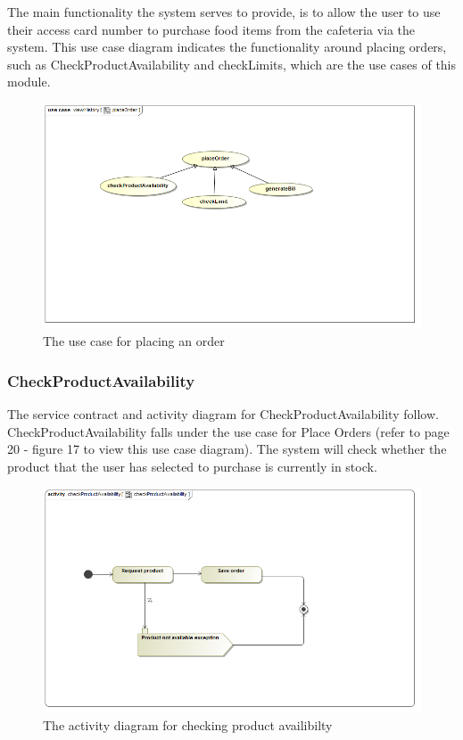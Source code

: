 \documentclass[a4paper,12pt]{article}
\begin{document}
The main functionality the system serves to provide, is  to allow the user to use their access card number to purchase food items from the cafeteria via the system. This use case diagram indicates the functionality around placing orders, such as CheckProductAvailability and checkLimits, which are the use cases of this module.

\begin{figure}[H]
  \centering
    \includegraphics[width=1.0\textwidth]{../images/placeOrder.png}
    \caption{The use case for placing an order} 
\end{figure}
 
\subsubsection{CheckProductAvailability}
The service contract and activity diagram for CheckProductAvailability follow. CheckProductAvailability falls under the use case for Place Orders (refer to page 20 - figure 17 to view this use case diagram). The system will check whether the product that the user has selected to purchase is currently in stock.
\begin{figure}[H]
  \centering
    \includegraphics[width=1.0\textwidth]{../images/checkProductAvailability.png}
    \caption{The activity diagram for checking product availibilty } 
\end{figure}
 
\end{document}
